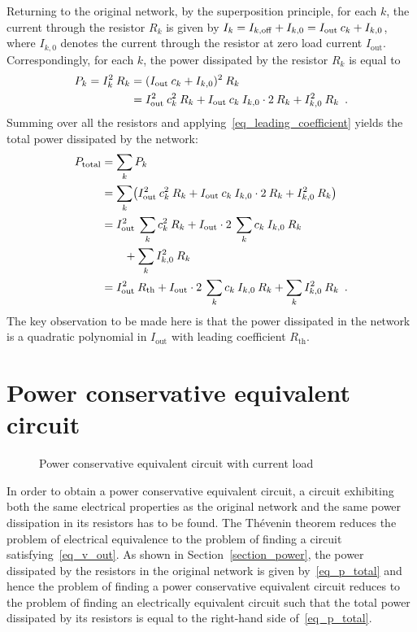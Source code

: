\documentclass[twoside]{IEEEtran}
\newcommand{\mult}{\nonscript\:}
\newcommand{\opoff}{{\operatorname{off}}}
\newcommand{\opout}{{\operatorname{out}}}
\newcommand{\opth}{{\operatorname{th}}}
\newcommand{\optotal}{{\operatorname{total}}}
\begin{document}
Returning to the original network, by the superposition principle, for each $k$, the current through the resistor $R_{k}$ is given by $I_{k} = I_{k, \opoff} + I_{k, 0} = I_{\opout} \mult c_{k} + I_{k, 0}$, where $I_{k, 0}$ denotes the current through the resistor at zero load current $I_{\opout}$.
Correspondingly, for each $k$, the power dissipated by the resistor $R_{k}$ is equal to
\begin{align*}
         P_{k}
       = I_{k}^{2} \mult R_{k}
     & = (I_{\opout} \mult c_{k} + I_{k, 0})^{2} \mult R_{k}
  \\ & = I_{\opout}^{2} \mult c_{k}^{2} \mult R_{k} + I_{\opout} \mult c_{k} \mult I_{k, 0} \cdot 2 \mult R_{k} + I_{k, 0}^{2} \mult R_{k}
  \enskip .
\end{align*}
Summing over all the resistors and applying~\eqref{eq_leading_coefficient} yields the total power dissipated by the network:
\begin{align}
         P_{\optotal}
     & = \sum_{k} P_{k}
  \nonumber \\ & = \sum_{k} \bigl( I_{\opout}^{2} \mult c_{k}^{2} \mult R_{k} + I_{\opout} \mult c_{k} \mult I_{k, 0} \cdot 2 \mult R_{k} + I_{k, 0}^{2} \mult R_{k} \bigr)
  \nonumber \\ & = I_{\opout}^{2} \mult \sum_{k} c_{k}^{2} \mult R_{k} + I_{\opout} \cdot 2 \mult \sum_{k} c_{k} \mult I_{k, 0} \mult R_{k} \nonumber \\ & \qquad + \sum_{k} I_{k, 0}^{2} \mult R_{k}
  \nonumber \\ & = I_{\opout}^{2} \mult R_{\opth} + I_{\opout} \cdot 2 \mult \sum_{k} c_{k} \mult I_{k, 0} \mult R_{k} + \sum_{k} I_{k, 0}^{2} \mult R_{k}
  \enskip .
  \label{eq_p_total}
\end{align}
The key observation to be made here is that the power dissipated in the network is a quadratic polynomial in $I_{\opout}$ with leading coefficient $R_{\opth}$.

\section{Power conservative equivalent circuit}
\label{section_circuit}

\begin{figure}
  \centering
  
  \caption{Power conservative equivalent circuit with current load}
  \label{figure_equivalent_circuit}
\end{figure}

In order to obtain a power conservative equivalent circuit, a circuit exhibiting both the same electrical properties as the original network and the same power dissipation in its resistors has to be found.
The Th\'{e}venin theorem reduces the problem of electrical equivalence to the problem of finding a circuit satisfying~\eqref{eq_v_out}.
As shown in Section~\ref{section_power}, the power dissipated by the resistors in the original network is given by~\eqref{eq_p_total} and hence the problem of finding a power conservative equivalent circuit reduces to the problem of finding an electrically equivalent circuit such that the total power dissipated by its resistors is equal to the right-hand side of~\eqref{eq_p_total}.
\end{document}
